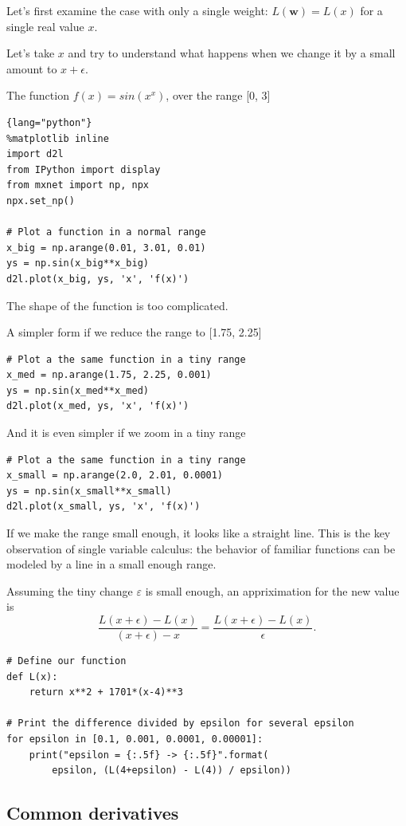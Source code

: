 Let's first examine the case with only a single weight: $L(\mathbf{w}) = L(x)$
for a single real value $x$.

Let's take $x$ and try to understand what happens when we change it by a small
amount to $x + \epsilon$.

The function $f(x) = sin(x^x)$, over the range [0, 3]
\begin{lstlisting}{lang="python"}
%matplotlib inline
import d2l
from IPython import display
from mxnet import np, npx
npx.set_np()

# Plot a function in a normal range
x_big = np.arange(0.01, 3.01, 0.01)
ys = np.sin(x_big**x_big)
d2l.plot(x_big, ys, 'x', 'f(x)')
\end{lstlisting}
The shape of the function is too complicated. 

A simpler form if we reduce the range to [1.75, 2.25]
\begin{lstlisting}
# Plot a the same function in a tiny range
x_med = np.arange(1.75, 2.25, 0.001)
ys = np.sin(x_med**x_med)
d2l.plot(x_med, ys, 'x', 'f(x)')
\end{lstlisting}

And it is even simpler if we zoom in a tiny range
\begin{lstlisting}
# Plot a the same function in a tiny range
x_small = np.arange(2.0, 2.01, 0.0001)
ys = np.sin(x_small**x_small)
d2l.plot(x_small, ys, 'x', 'f(x)')
\end{lstlisting}

If we make the range small enough, it looks like a straight line.
This is the key observation of single variable calculus: the behavior of
familiar functions can be modeled by a line in a small enough range.

Assuming the tiny change $\varepsilon$ is small enough, an appriximation for the new value is
\begin{equation}
\frac{L(x+\epsilon) - L(x)}{(x+\epsilon) - x} = \frac{L(x+\epsilon) - L(x)}{\epsilon}.
\end{equation}

\begin{lstlisting}
# Define our function
def L(x):
    return x**2 + 1701*(x-4)**3

# Print the difference divided by epsilon for several epsilon
for epsilon in [0.1, 0.001, 0.0001, 0.00001]:
    print("epsilon = {:.5f} -> {:.5f}".format(
        epsilon, (L(4+epsilon) - L(4)) / epsilon))
\end{lstlisting}


\subsection{Common derivatives}

